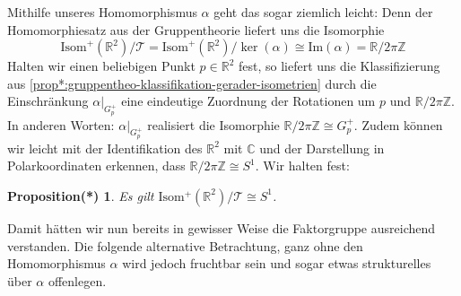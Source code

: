 \documentclass[a4paper, ngerman]{article}
\newcounter{chapter}
\numberwithin{equation}{chapter}
\theoremstyle{plain}
\newtheorem{propositionstrd}{Proposition(*)}[chapter]
\theoremstyle{definition}
\newcommand{\geradisometr}{\ensuremath{\mathrm{Isom}^+(\mathbb R^2)}}
\begin{document}
Mithilfe unseres Homomorphismus \(\alpha\) geht das sogar ziemlich leicht: Denn der Homomorphiesatz aus der Gruppentheorie liefert uns die Isomorphie 
\begin{equation*}
    \geradisometr/\mathcal T = \geradisometr/\ker(\alpha) \cong \mathrm{Im}(\alpha) = \mathbb R/2\pi\mathbb Z
\end{equation*}
Halten wir einen beliebigen Punkt \(p\in \mathbb R^2\) fest, so liefert uns die Klassifizierung aus \cref{prop*:gruppentheo-klassifikation-gerader-isometrien} durch die Einschränkung \(\alpha|_{G_p^+}\) eine eindeutige Zuordnung der Rotationen um \(p\) und \(\mathbb R/2\pi\mathbb Z\). In anderen Worten: \(\alpha|_{G_p^+}\) realisiert die Isomorphie \(\mathbb R/2\pi\mathbb Z \cong G_p^+\). Zudem können wir leicht mit der Identifikation des \(\mathbb R^2\) mit \(\mathbb C\) und der Darstellung in Polarkoordinaten erkennen, dass \(\mathbb R/2\pi\mathbb Z\cong S^1\). Wir halten fest: 
\begin{propositionstrd}\label{prop*:gestalt-quotient-über-translationen}
    Es gilt \(\mathrm{Isom^+(\mathbb R^2)}/\mathcal T \cong S^1\).
\end{propositionstrd}
\noindent Damit hätten wir nun bereits in gewisser Weise die Faktorgruppe ausreichend verstanden. Die folgende alternative Betrachtung, ganz ohne den Homomorphismus \(\alpha\) wird jedoch fruchtbar sein und sogar etwas strukturelles über \(\alpha\) offenlegen. 
\end{document}
